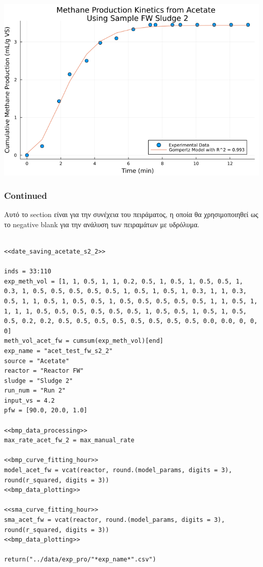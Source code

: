 \documentclass[11pt]{article}
\begin{document}
\begin{center}
\includegraphics[width=.9\linewidth]{../plots/BMPs/Acetate/specific_methane_kinetics_acet_test_fw_s2.png}
\end{center}

\subsubsection{Continued}
\label{sec:org8b3ce0f}
Αυτό το section είναι για την συνέχεια του πειράματος, η οποία θα χρησιμοποιηθεί ως το negative blank για την ανάλυση των πειραμάτων με υδρόλυμα.

\begin{verbatim}

<<date_saving_acetate_s2_2>>

inds = 33:110
exp_meth_vol = [1, 1, 0.5, 1, 1, 0.2, 0.5, 1, 0.5, 1, 0.5, 0.5, 1, 0.3, 1, 0.5, 0.5, 0.5, 0.5, 0.5, 1, 0.5, 1, 0.5, 1, 0.3, 1, 1, 0.3, 0.5, 1, 1, 0.5, 1, 0.5, 0.5, 1, 0.5, 0.5, 0.5, 0.5, 0.5, 1, 1, 0.5, 1, 1, 1, 1, 0.5, 0.5, 0.5, 0.5, 0.5, 0.5, 1, 0.5, 0.5, 1, 0.5, 1, 0.5, 0.5, 0.2, 0.2, 0.5, 0.5, 0.5, 0.5, 0.5, 0.5, 0.5, 0.5, 0.0, 0.0, 0, 0, 0]
meth_vol_acet_fw = cumsum(exp_meth_vol)[end]
exp_name = "acet_test_fw_s2_2"
source = "Acetate"
reactor = "Reactor FW"
sludge = "Sludge 2"
run_num = "Run 2"
input_vs = 4.2
pfw = [90.0, 20.0, 1.0]

<<bmp_data_processing>>
max_rate_acet_fw_2 = max_manual_rate

<<bmp_curve_fitting_hour>>
model_acet_fw = vcat(reactor, round.(model_params, digits = 3), round(r_squared, digits = 3))
<<bmp_data_plotting>>

<<sma_curve_fitting_hour>>
sma_acet_fw = vcat(reactor, round.(model_params, digits = 3), round(r_squared, digits = 3))  
<<bmp_data_plotting>>

return("../data/exp_pro/"*exp_name*".csv")

\end{verbatim}
\end{document}
